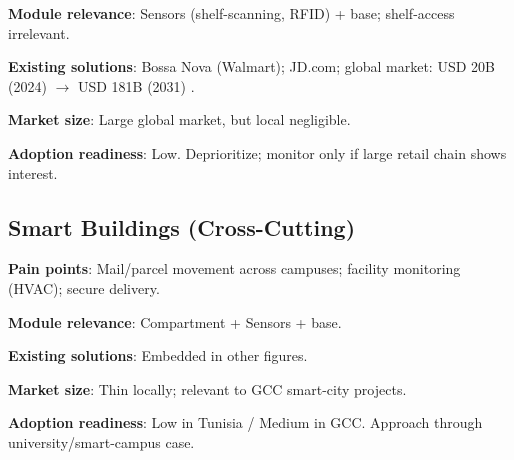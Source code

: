\textbf{Module relevance}: Sensors (shelf-scanning, RFID) + base; shelf-access irrelevant.

\textbf{Existing solutions}: Bossa Nova (Walmart); JD.com; global market: USD 20B (2024) $\rightarrow$ USD 181B (2031) \cite{gii_retail2030,nordmodules_retail,dudarenok_retail_china}.

\textbf{Market size}: Large global market, but local negligible.

\textbf{Adoption readiness}: Low. Deprioritize; monitor only if large retail chain shows interest.

\subsection{Smart Buildings (Cross-Cutting)}

\textbf{Pain points}: Mail/parcel movement across campuses; facility monitoring (HVAC); secure delivery.

\textbf{Module relevance}: Compartment + Sensors + base.

\textbf{Existing solutions}: Embedded in other figures.

\textbf{Market size}: Thin locally; relevant to GCC smart-city projects.

\textbf{Adoption readiness}: Low in Tunisia / Medium in GCC. Approach through university/smart-campus case.